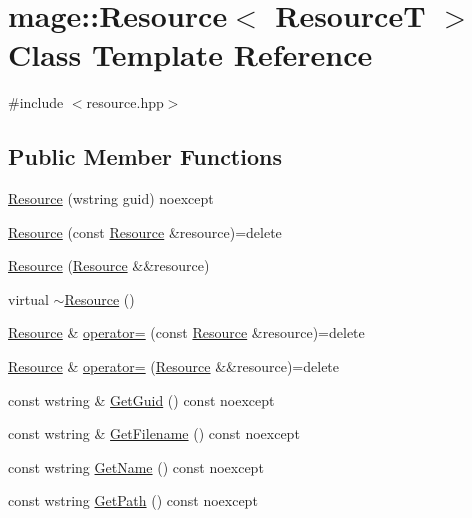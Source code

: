 \hypertarget{classmage_1_1_resource}{}\section{mage\+:\+:Resource$<$ ResourceT $>$ Class Template Reference}
\label{classmage_1_1_resource}


{\ttfamily \#include $<$resource.\+hpp$>$}

\subsection*{Public Member Functions}
\begin{DoxyCompactItemize}
\item 
\hyperlink{classmage_1_1_resource_a397a81a1195dea231776db9787cad52d}{Resource} (wstring guid) noexcept
\item 
\hyperlink{classmage_1_1_resource_a53da586d9bae285ab50c4cca2421a9ce}{Resource} (const \hyperlink{classmage_1_1_resource}{Resource} \&resource)=delete
\item 
\hyperlink{classmage_1_1_resource_a86216fd0f8072285ad1582e296a8a3fc}{Resource} (\hyperlink{classmage_1_1_resource}{Resource} \&\&resource)
\item 
virtual \hyperlink{classmage_1_1_resource_a56a3ac799224e100b271b65ec455b59e}{$\sim$\+Resource} ()
\item 
\hyperlink{classmage_1_1_resource}{Resource} \& \hyperlink{classmage_1_1_resource_a938159cb02ec565b9b957f993db4769d}{operator=} (const \hyperlink{classmage_1_1_resource}{Resource} \&resource)=delete
\item 
\hyperlink{classmage_1_1_resource}{Resource} \& \hyperlink{classmage_1_1_resource_aff0080e944136b1b0e889d4dd6cfb11f}{operator=} (\hyperlink{classmage_1_1_resource}{Resource} \&\&resource)=delete
\item 
const wstring \& \hyperlink{classmage_1_1_resource_adaa2464cb1fdb51a3f6028c0f316d083}{Get\+Guid} () const noexcept
\item 
const wstring \& \hyperlink{classmage_1_1_resource_a21bed60ba52a741eaffddc953f241be7}{Get\+Filename} () const noexcept
\item 
const wstring \hyperlink{classmage_1_1_resource_a7e056c97f70a3f7211d9456bbda51010}{Get\+Name} () const noexcept
\item 
const wstring \hyperlink{classmage_1_1_resource_a9df55cc00e0412b1435538e8107ee563}{Get\+Path} () const noexcept
\end{DoxyCompactItemize}

